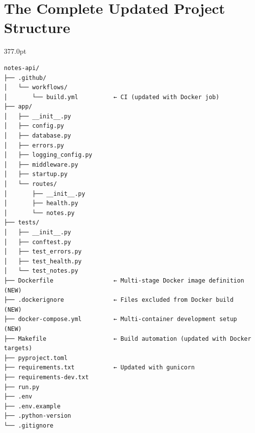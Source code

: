 \setcounter{section}{9}
\section{The Complete Updated Project Structure}\label{18-containerization:1810-the-complete-updated-project-structure}

\begin{diagrambox}[short]{377.0pt}
\begin{Verbatim}[fontsize=\fontsize{9.0}{8.55}\selectfont]
notes-api/
├── .github/
│   └── workflows/
│       └── build.yml          ← CI (updated with Docker job)
├── app/
│   ├── __init__.py
│   ├── config.py
│   ├── database.py
│   ├── errors.py
│   ├── logging_config.py
│   ├── middleware.py
│   ├── startup.py
│   └── routes/
│       ├── __init__.py
│       ├── health.py
│       └── notes.py
├── tests/
│   ├── __init__.py
│   ├── conftest.py
│   ├── test_errors.py
│   ├── test_health.py
│   └── test_notes.py
├── Dockerfile                 ← Multi-stage Docker image definition (NEW)
├── .dockerignore              ← Files excluded from Docker build (NEW)
├── docker-compose.yml         ← Multi-container development setup (NEW)
├── Makefile                   ← Build automation (updated with Docker targets)
├── pyproject.toml
├── requirements.txt           ← Updated with gunicorn
├── requirements-dev.txt
├── run.py
├── .env
├── .env.example
├── .python-version
└── .gitignore
\end{Verbatim}
\end{diagrambox}

